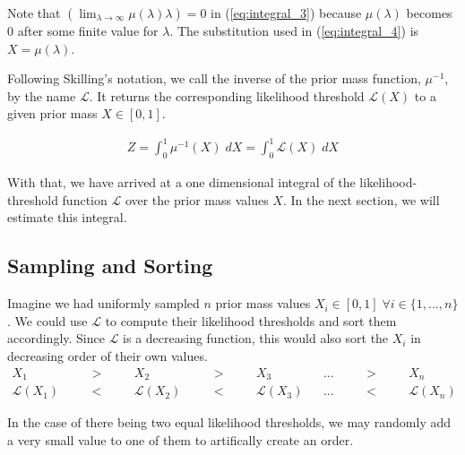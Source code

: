 \documentclass[12pt, a4paper]{report}
\begin{document}
Note that $\left(\lim_{\lambda \rightarrow \infty} \mu(\lambda) \lambda\right) = 0$ in (\ref{eq:integral_3}) because $\mu(\lambda)$ becomes $0$ after some finite value for $\lambda$. The substitution used in (\ref{eq:integral_4}) is $X = \mu(\lambda)$.

Following Skilling's notation, we call the inverse of the prior mass function, $\mu^{-1}$, by the name $\mathcal{L}$.
It returns the corresponding likelihood threshold $\mathcal{L}(X)$ to a given prior mass $X \in [0,1]$.

\begin{align}
    Z = \int_0^1 \mu^{-1}(X) \; dX = \int_0^1 \mathcal{L}(X) \; dX
    \label{eq:integral_5}
\end{align}

With that, we have arrived at a one dimensional integral of the likelihood-threshold function $\mathcal{L}$ over the prior mass values $X$. In the next section, we will estimate this integral.

\FloatBarrier
\subsection{Sampling and Sorting}

Imagine we had uniformly sampled $n$ prior mass values $X_i \in [0,1] \; \forall i \in \{1, ..., n\}$.
We could use $\mathcal{L}$ to compute their likelihood thresholds and sort them accordingly.
Since $\mathcal{L}$ is a decreasing function, this would also sort the $X_i$ in decreasing order of their own values.
\begin{align}
    X_1 & \quad &>& \quad &X_2 & \quad &>& \quad &X_3 & &...& \quad &>& \quad &X_n \nonumber\\
    \mathcal{L}(X_1)& &<& &\mathcal{L}(X_2)& &<& &\mathcal{L}(X_3)&  &...& &<& &\mathcal{L}(X_n) \label{eq:sample_ordering}
\end{align}

In the case of there being two equal likelihood thresholds, we may randomly add a very small value to one of them to artifically create an order.
\end{document}
